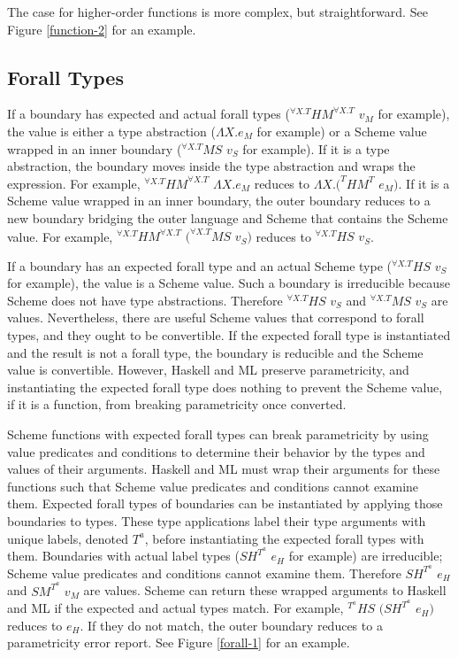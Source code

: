 

The case for higher-order functions is more complex, but straightforward.  See Figure \ref{function-2} for an example.



\subsection{Forall Types}

If a boundary has expected and actual forall types ($^{\forall X.T}HM^{\forall X.T}$ $v_{M}$ for example), the value is either a type abstraction ($\Lambda X.e_{M}$ for example) or a Scheme value wrapped in an inner boundary ($^{\forall X.T}MS$ $v_{S}$ for example).  If it is a type abstraction, the boundary moves inside the type abstraction and wraps the expression.  For example, $^{\forall X.T}HM^{\forall X.T}$ $\Lambda X.e_{M}$ reduces to $\Lambda X.(^{T}HM^{T}$ $e_{M})$.  If it is a Scheme value wrapped in an inner boundary, the outer boundary reduces to a new boundary bridging the outer language and Scheme that contains the Scheme value.  For example, $^{\forall X.T}HM^{\forall X.T}$ $(^{\forall X.T}MS$ $v_{S})$ reduces to $^{\forall X.T}HS$ $v_{S}$.

If a boundary has an expected forall type and an actual Scheme type ($^{\forall X.T}HS$ $v_{S}$ for example), the value is a Scheme value.  Such a boundary is irreducible because Scheme does not have type abstractions.  Therefore $^{\forall X.T}HS$ $v_{S}$ and $^{\forall X.T}MS$ $v_{S}$ are values.  Nevertheless, there are useful Scheme values that correspond to forall types, and they ought to be convertible.  If the expected forall type is instantiated and the result is not a forall type, the boundary is reducible and the Scheme value is convertible.  However, Haskell and ML preserve parametricity, and instantiating the expected forall type does nothing to prevent the Scheme value, if it is a function, from breaking parametricity once converted.

Scheme functions with expected forall types can break parametricity by using value predicates and conditions to determine their behavior by the types and values of their arguments.  Haskell and ML must wrap their arguments for these functions such that Scheme value predicates and conditions cannot examine them.  Expected forall types of boundaries can be instantiated by applying those boundaries to types.  These type applications label their type arguments with unique labels, denoted $T^{a}$, before instantiating the expected forall types with them.  Boundaries with actual label types ($SH^{T^{a}}$ $e_{H}$ for example) are irreducible; Scheme value predicates and conditions cannot examine them.  Therefore $SH^{T^{a}}$ $e_{H}$ and $SM^{T^{a}}$ $v_{M}$ are values.  Scheme can return these wrapped arguments to Haskell and ML if the expected and actual types match.  For example, $^{T^{a}}HS$ $(SH^{T^{a}}$ $e_{H})$ reduces to $e_{H}$.  If they do not match, the outer boundary reduces to a parametricity error report.  See Figure \ref{forall-1} for an example.

